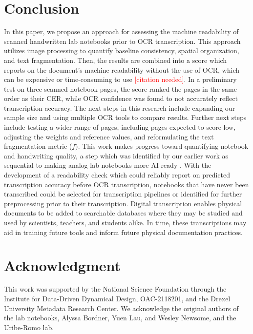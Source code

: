 \documentclass[conference]{IEEEtran}
\newcommand{\todo}[1]{\textcolor{red}{[#1]}}
\begin{document}
\section{Conclusion}

In this paper, we propose an approach for assessing the machine readability of
scanned handwritten lab notebooks prior to OCR transcription. This approach
utilizes image processing to quantify baseline consistency, spatial
organization, and text fragmentation. Then, the results are combined into a
score which reports on the document's machine readability without the use of
OCR, which can be expensive or time-consuming to use \todo{citation needed}. In
a preliminary test on three scanned notebook pages, the score ranked the pages
in the same order as their CER, while OCR confidence was found to not
accurately reflect transcription accuracy. The next steps in this research
include expanding our sample size and using multiple OCR tools to compare
results.
Further next steps include testing a wider range of pages, including pages
expected to score low, adjusting the weights and reference values, and
reformulating the text fragmentation metric ($f$).
This work makes progress toward quantifying notebook and handwriting quality, a
step which was identified by our earlier work as sequential to making analog
lab notebooks more AI-ready \cite{pepper2025}. With the development of a
readability check which could reliably report on predicted transcription
accuracy before OCR transcription, notebooks that have never been transcribed
could be selected for transcription pipelines or identified for further
preprocessing prior to their transcription. Digital transcription enables
physical documents to be added to searchable databases where they may be
studied and used by scientists, teachers, and students alike. In time, these
transcriptions may aid in training future tools and inform future physical
documentation practices.

\section*{Acknowledgment}

This work was supported by the National Science Foundation through the
Institute for Data-Driven Dynamical Design, OAC-2118201, and the Drexel
University Metadata Research Center. We acknowledge the original authors of the
lab notebooks, Alyssa Bordner, Yuen Lau, and Wesley Newsome, and the
Uribe-Romo lab.



\end{document}
